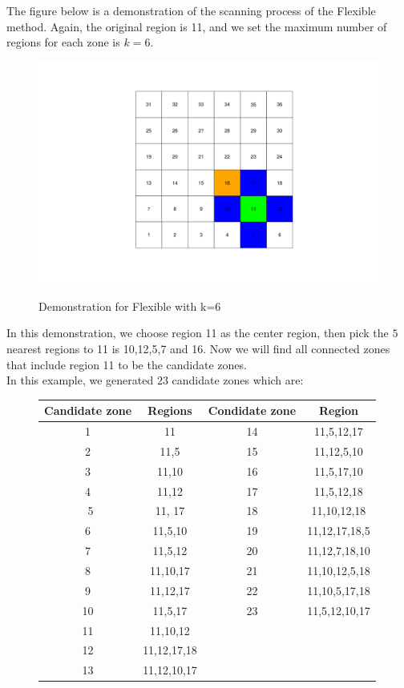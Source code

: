 \documentclass[12pt]{article}
\begin{document}
\begin{enumerate}
	
	The figure below is a demonstration of the scanning process of the Flexible method. Again, the original region is 11, and we set the maximum number of regions for each zone is $k=6$.\\
	\begin{figure}[!ht]
		
		\centering
		\includegraphics[scale=0.2]{Demo_Flexible}\\
		\caption{Demonstration for Flexible with k=6 \label{f:gull}}
		
	\end{figure}
	
	
	
	In this demonstration, we choose region 11 as the center region, then pick the $5$ nearest regions to 11 is 10,12,5,7 and 16. Now we will find all connected zones that include region 11 to be the candidate zones.  \\  
	
	In this example, we generated $23$ candidate zones which are: \\
	

		
	\begin{figure}[!ht]
\hspace{2cm}\begin{tabular}{|c|c|c|c|}

		\hline
		Candidate zone & Regions & Condidate zone & Region \\
		\hline
		1 & 11 & 14 & 11,5,12,17 \\
		2 & 11,5 & 	15 & 11,12,5,10 \\
		3 & 11,10 & 16 & 11,5,17,10 \\	
		4 & 11,12 & 	17 & 11,5,12,18 \\\
		5 & 11, 17 & 18 & 11,10,12,18  \\
		6 &  11,5,10 & 19 &  11,12,17,18,5  \\
		7 & 11,5,12 & 20 &   11,12,7,18,10  \\
		8 & 11,10,17 & 21 & 11,10,12,5,18 \\
		9 & 11,12,17  & 22 & 11,10,5,17,18 \\
		10 & 11,5,17 &   23& 11,5,12,10,17 \\
		11 & 11,10,12 & &\\
		12 & 11,12,17,18 & &\\
		13 & 11,12,10,17 & &\\
		

\end{tabular}
\end{figure}
\end{enumerate}
\end{document}
